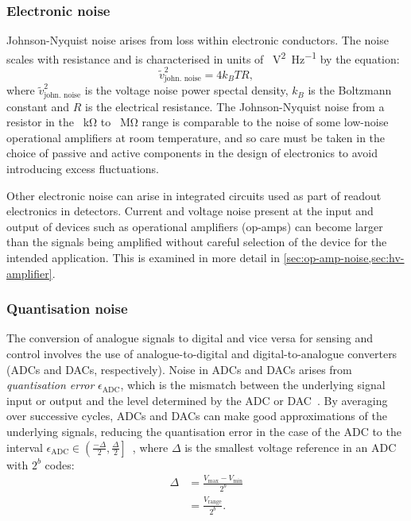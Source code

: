 \subsubsection{\label{sec:johnson-nyquist-noise}Electronic noise}
Johnson-Nyquist noise arises from loss within electronic conductors. The noise scales with resistance and is characterised in units of \SI{}{\volt^2\per\hertz} by the equation:
\begin{equation}
  \tilde{v}^2_{\text{john. noise}} = 4 k_B T R,
\end{equation}
where $\tilde{v}^2_{\text{john. noise}}$ is the voltage noise power spectal density, $k_B$ is the Boltzmann constant and $R$ is the electrical resistance. The Johnson-Nyquist noise from a resistor in the \SI{}{\kilo\ohm} to \SI{}{\mega\ohm} range is comparable to the noise of some low-noise operational amplifiers at room temperature, and so care must be taken in the choice of passive and active components in the design of electronics to avoid introducing excess fluctuations.

Other electronic noise can arise in integrated circuits used as part of readout electronics in detectors. Current and voltage noise present at the input and output of devices such as operational amplifiers (op-amps) can become larger than the signals being amplified without careful selection of the device for the intended application. This is examined in more detail in \cref{sec:op-amp-noise,sec:hv-amplifier}.

\subsubsection{\label{sec:quantisation-noise}Quantisation noise}
The conversion of analogue signals to digital and vice versa for sensing and control involves the use of analogue-to-digital and digital-to-analogue converters (\glspl{ADC} and \glspl{DAC}, respectively). Noise in \glspl{ADC} and \glspl{DAC} arises from \emph{quantisation error} $\epsilon_{\text{ADC}}$, which is the mismatch between the underlying signal input or output and the level determined by the \gls{ADC} or \gls{DAC}~\cite{Allen1997}. By averaging over successive cycles, \glspl{ADC} and \glspl{DAC} can make good approximations of the underlying signals, reducing the quantisation error in the case of the \gls{ADC} to the interval $\epsilon_{\text{ADC}} \in \left( \frac{-\Delta}{2}, \frac{\Delta}{2} \right]$~\cite{Allen1997}, where $\Delta$ is the smallest voltage reference in an \gls{ADC} with $2^b$ codes:
\begin{equation}
  \begin{split}
    \Delta &= \frac{V_{\text{max}} - V_{\text{min}}}{2^{b}} \\
           &= \frac{V_{\text{range}}}{2^{b}}.
  \end{split}
\end{equation}

